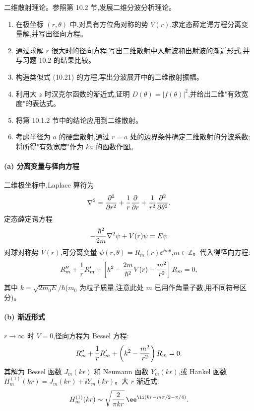 \begin{question}
二维散射理论。参照第 10.2 节,发展二维分波分析理论。
\begin{enumerate}
\item 在极坐标 $(r,\theta)$ 中,对具有方位角对称的势 $V(r)$,求定态薛定谔方程分离变量解,并写出径向方程。
\item 通过求解 $r$ 很大时的径向方程,写出二维散射中入射波和出射波的渐近形式,并与习题 10.2 的结果比较。
\item 构造类似式 (10.21) 的方程,写出分波展开中的二维散射振幅。
\item 利用大 $z$ 时汉克尔函数的渐近式,证明 $D(\theta)=|f(\theta)|^2$,并给出二维"有效宽度"的表达式。
\item 将第 10.1.2 节中的结论应用到二维散射。
\item 考虑半径为 $a$ 的硬盘散射,通过 $r=a$ 处的边界条件确定二维散射的分波系数;将所得"有效宽度"作为 $ka$ 的函数作图。
\end{enumerate}

\par\smallskip
{}

\begin{solution}
\paragraph{(a) 分离变量与径向方程}

二维极坐标中,Laplace 算符为
\[
\nabla^2={\partial^2\over\partial r^2}+{1\over r}{\partial\over\partial r}+{1\over r^2}{\partial^2\over\partial\theta^2}.
\]
定态薛定谔方程
\[
-{\hbar^2\over2m}\nabla^2\psi+V(r)\psi=E\psi
\]
对球对称势 $V(r)$,可分离变量 $\psi(r,\theta)=R_m(r)\ee^{\ii m\theta}$,$m\in\mathbb Z$。代入得径向方程:
\[
R_m''+{1\over r}R_m'+\left[k^2-{2m\over\hbar^2}V(r)-{m^2\over r^2}\right]R_m=0,
\]
其中 $k=\sqrt{2m_0E}/\hbar$($m_0$ 为粒子质量,注意此处 $m$ 已用作角量子数,用不同符号区分)。

\paragraph{(b) 渐近形式}

$r\to\infty$ 时 $V=0$,径向方程为 Bessel 方程:
\[
R_m''+{1\over r}R_m'+\left(k^2-{m^2\over r^2}\right)R_m=0.
\]
其解为 Bessel 函数 $J_m(kr)$ 和 Neumann 函数 $Y_m(kr)$,或 Hankel 函数 $H_m^{(1)}(kr)=J_m(kr)+\ii Y_m(kr)$。大 $r$ 渐近式:
\[
H_m^{(1)}(kr)\sim\sqrt{2\over\pi kr}\,\ee^{\ii(kr-m\pi/2-\pi/4)}.
\]


\end{solution}
\end{question}
